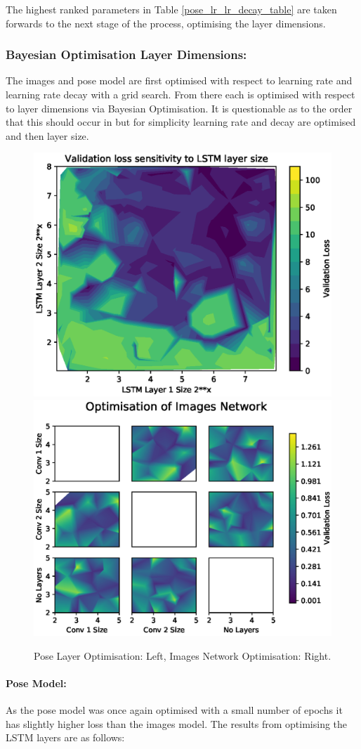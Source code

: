 \documentclass[11pt,twoside]{report}
\begin{document}
The highest ranked parameters in Table \ref{pose_lr_lr_decay_table} are taken forwards to the next stage of the process, optimising the layer dimensions.
 
\subsubsection{Bayesian Optimisation Layer Dimensions:}
The images and pose model are first optimised with respect to learning rate and learning rate decay with a grid search. From there each is optimised with respect to layer dimensions via Bayesian Optimisation. It is questionable as to the order that this should occur in but for simplicity learning rate and decay are optimised and then layer size.



\noindent \begin{figure}[h!]
	\includegraphics[width = 0.5\hsize]{figures/pose_lstm1_lstm2_graph_.eps}
	\includegraphics[width = 0.5\hsize]{figures/opt_bayes_images_nn.eps}
	\caption{Pose Layer Optimisation: Left, Images Network Optimisation: Right.}
	\label{bayes_opt_fig}
\end{figure}

\paragraph{Pose Model:} As the pose model was once again optimised with a small number of epochs it has slightly higher loss than the images model. The results from optimising the LSTM layers are as follows:
\end{document}
